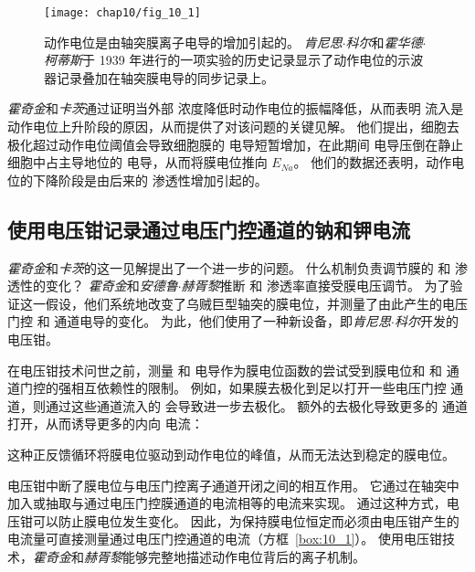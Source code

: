 \begin{figure}[htbp]
	\centering
	\texttt{[image: chap10/fig\_10\_1]}
	\caption{动作电位是由轴突膜离子电导的增加引起的。
		\textit{肯尼思$\cdot$科尔}和\textit{霍华德$\cdot$柯蒂斯}于 1939 年进行的一项实验的历史记录显示了动作电位的示波器记录叠加在轴突膜电导的同步记录上。}
	\label{fig:10_1}
\end{figure}


\textit{霍奇金}和\textit{卡茨}通过证明当外部  浓度降低时动作电位的振幅降低，从而表明  流入是动作电位上升阶段的原因，从而提供了对该问题的关键见解。
他们提出，细胞去极化超过动作电位阈值会导致细胞膜的  电导短暂增加，在此期间  电导压倒在静止细胞中占主导地位的  电导，从而将膜电位推向 $E_{Na}$。 
他们的数据还表明，动作电位的下降阶段是由后来的  渗透性增加引起的。



\subsection{使用电压钳记录通过电压门控通道的钠和钾电流}

\textit{霍奇金}和\textit{卡茨}的这一见解提出了一个进一步的问题。
什么机制负责调节膜的  和  渗透性的变化？
\textit{霍奇金}和\textit{安德鲁$\cdot$赫胥黎}推断  和  渗透率直接受膜电压调节。
为了验证这一假设，他们系统地改变了乌贼巨型轴突的膜电位，并测量了由此产生的电压门控  和  通道电导的变化。
为此，他们使用了一种新设备，即\textit{肯尼思$\cdot$科尔}开发的电压钳。



在电压钳技术问世之前，测量  和  电导作为膜电位函数的尝试受到膜电位和  和  通道门控的强相互依赖性的限制。
例如，如果膜去极化到足以打开一些电压门控  通道，则通过这些通道流入的  会导致进一步去极化。 
额外的去极化导致更多的  通道打开，从而诱导更多的内向  电流：


这种正反馈循环将膜电位驱动到动作电位的峰值，从而无法达到稳定的膜电位。


电压钳中断了膜电位与电压门控离子通道开闭之间的相互作用。
它通过在轴突中加入或抽取与通过电压门控膜通道的电流相等的电流来实现。
通过这种方式，电压钳可以防止膜电位发生变化。
因此，为保持膜电位恒定而必须由电压钳产生的电流量可直接测量通过电压门控通道的电流（方框~\ref{box:10_1}）。
使用电压钳技术，\textit{霍奇金}和\textit{赫胥黎}能够完整地描述动作电位背后的离子机制。


